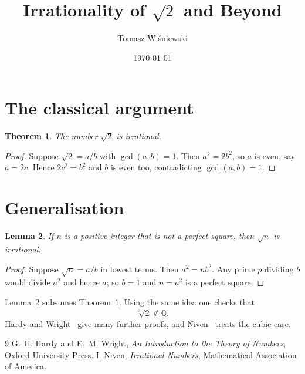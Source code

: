 \documentclass[11pt,a4paper]{article}
\newtheorem{theorem}{Theorem}
\newtheorem{lemma}[theorem]{Lemma}
\begin{document}
\title{Irrationality of $\sqrt2$ and Beyond}
\author{Tomasz Wi\'sniewski}
\date{\today}
\maketitle
\section{The classical argument}
\begin{theorem}\label{thm:sqrt2}
The number $\sqrt2$ is irrational.
\end{theorem}
\begin{proof}
Suppose $\sqrt2=a/b$ with $\gcd(a,b)=1$. Then $a^2=2b^2$, so $a$ is even, say $a=2c$. Hence $2c^2=b^2$ and $b$ is even too, contradicting $\gcd(a,b)=1$.
\end{proof}

\section{Generalisation}
\begin{lemma}\label{lem:root}
If $n$ is a positive integer that is not a perfect square, then $\sqrt n$ is irrational.
\end{lemma}
\begin{proof}
Suppose $\sqrt n=a/b$ in lowest terms. Then $a^2=nb^2$. Any prime $p$ dividing $b$ would divide $a^2$ and hence $a$; so $b=1$ and $n=a^2$ is a perfect square.
\end{proof}

Lemma~\ref{lem:root} subsumes Theorem~\ref{thm:sqrt2}. Using the same idea one checks that
\begin{equation}
\sqrt[3]{2}\notin\mathbb{Q}.
\end{equation}
Hardy and Wright~\cite{hw} give many further proofs, and Niven~\cite[p.~21]{niven} treats the cubic case.

\begin{thebibliography}{9}
 G.~H. Hardy and E.~M. Wright, \emph{An Introduction to the Theory of Numbers}, Oxford University Press.
 I. Niven, \emph{Irrational Numbers}, Mathematical Association of America.
\end{thebibliography}
\end{document}
